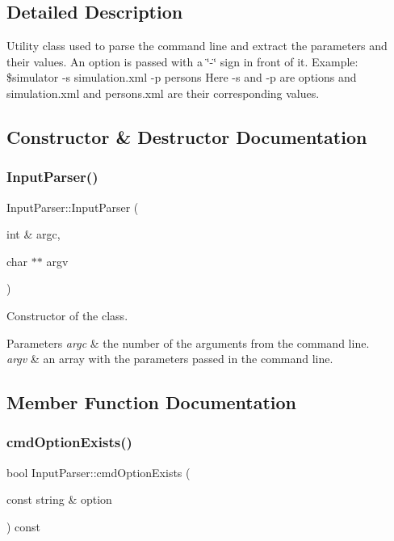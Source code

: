 \subsection{Detailed Description}
Utility class used to parse the command line and extract the parameters and their values. An option is passed with a \char`\"{}-\/\char`\"{} sign in front of it. Example\+: \$simulator -\/s simulation.\+xml -\/p persons Here -\/s and -\/p are options and simulation.\+xml and persons.\+xml are their corresponding values. 

\subsection{Constructor \& Destructor Documentation}
\mbox{\label{class_input_parser_af9fa5ead1f28b5294a713410df5b9531}} 
\subsubsection{\texorpdfstring{Input\+Parser()}{InputParser()}}
{\footnotesize\ttfamily Input\+Parser\+::\+Input\+Parser (\begin{DoxyParamCaption}\item[{int \&}]{argc,  }\item[{char $\ast$$\ast$}]{argv }\end{DoxyParamCaption})}

Constructor of the class. 
\begin{DoxyParams}{Parameters}
{\em argc} & the number of the arguments from the command line. \\
\hline
{\em argv} & an array with the parameters passed in the command line. \\
\hline
\end{DoxyParams}


\subsection{Member Function Documentation}
\mbox{\label{class_input_parser_ad3d06a9c59e91f425295bdc8408e0544}} 
\subsubsection{\texorpdfstring{cmd\+Option\+Exists()}{cmdOptionExists()}}
{\footnotesize\ttfamily bool Input\+Parser\+::cmd\+Option\+Exists (\begin{DoxyParamCaption}\item[{const string \&}]{option }\end{DoxyParamCaption}) const}

